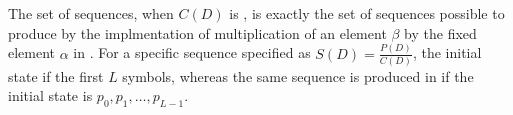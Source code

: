 \begin{blackbox}
  The set of  sequences, when $C(D)$ is , is exactly the set of sequences possible to produce by the implmentation of multiplication of an element $\beta$ by the fixed element $\alpha$ in .
  \tcblower{}
  For a specific sequence specified as $S(D) = \frac{P(D)}{C(D)}$, the initial state if the first $L$ symbols, whereas the same sequence is produced in  if the initial state is $p_{0}, p_{1}, \ldots, p_{L-1}$.
\end{blackbox}

